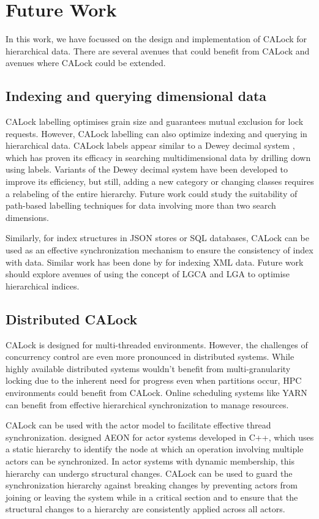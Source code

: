 \section{Future Work}

In this work, we have focussed on the design and implementation of CALock for hierarchical data. There are several avenues that could benefit from CALock and avenues where CALock could be extended.

\subsection{Indexing and querying dimensional data}
CALock labelling optimises grain size and guarantees mutual exclusion for lock requests. However, CALock labelling can also optimize indexing and querying in hierarchical data. CALock labels appear similar to a Dewey decimal system \cite{DBLP:journals/jd/Sweeney83}, which has proven its efficacy in searching multidimensional data by drilling down using labels. Variants of the Dewey decimal system have been developed to improve its efficiency, but still, adding a new category or changing classes requires a relabeling of the entire hierarchy. Future work could study the suitability of path-based labelling techniques for data involving more than two search dimensions. 

Similarly, for index structures in JSON stores or SQL databases, CALock can be used as an effective synchronization mechanism to ensure the consistency of index with data. Similar work has been done by \citet{DBLP:journals/pvldb/FinisBK0MF15} for indexing XML data. Future work should explore avenues of using the concept of LGCA and LGA to optimise hierarchical indices. 

\subsection{Distributed CALock}

CALock is designed for multi-threaded environments. However, the challenges of concurrency control are even more pronounced in distributed systems. While highly available distributed systems wouldn't benefit from multi-granularity locking due to the inherent need for progress even when partitions occur, HPC environments could benefit from CALock. Online scheduling systems like YARN \cite{DBLP:conf/cloud/VavilapalliMDAKEGLSSSCORRB13} can benefit from effective hierarchical synchronization to manage resources.

CALock can be used with the actor model to facilitate effective thread synchronization. \citet{sang_scalable_2020} designed AEON for actor systems developed in C++, which uses a static hierarchy to identify the node at which an operation involving multiple actors can be synchronized. In actor systems with dynamic membership, this hierarchy can undergo structural changes. CALock can be used to guard the synchronization hierarchy against breaking changes by preventing actors from joining or leaving the system while in a critical section and to ensure that the structural changes to a hierarchy are consistently applied across all actors.

